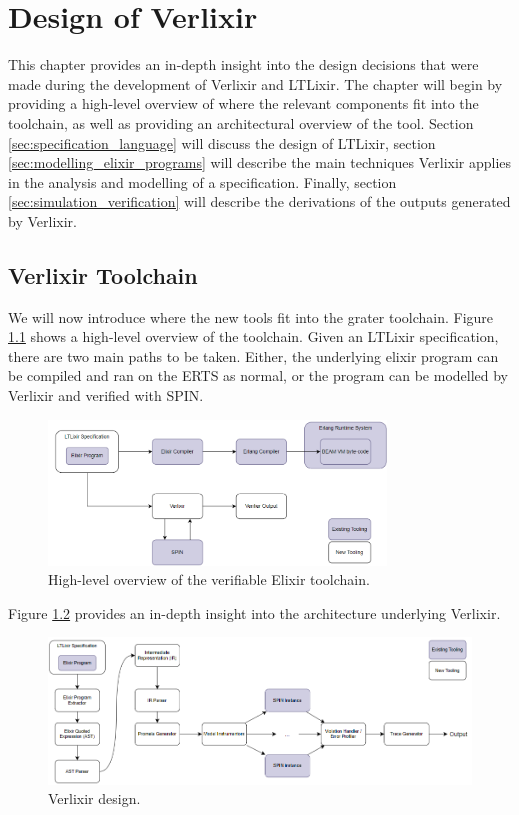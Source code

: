 \chapter{Design of Verlixir} \label{chap:design}
This chapter provides an in-depth insight into the design decisions that were made during the development of Verlixir and LTLixir. The chapter will begin by providing a high-level overview of where the relevant components fit into the toolchain, as well as providing an architectural overview of the tool. Section \ref{sec:specification_language} will discuss the design of LTLixir, section \ref{sec:modelling_elixir_programs} will describe the main techniques Verlixir applies in the analysis and modelling of a specification. Finally, section \ref{sec:simulation_verification} will describe the derivations of the outputs generated by Verlixir.  
\section{Verlixir Toolchain} \label{sec:toolchain}
We will now introduce where the new tools fit into the grater toolchain. Figure \ref{fig:high_level} shows a high-level overview of the toolchain. Given an LTLixir specification, there are two main paths to be taken. Either, the underlying elixir program can be compiled and ran on the ERTS as normal, or the program can be modelled by Verlixir and verified with SPIN.
\begin{figure}[H]
    \centering
    \includegraphics[width=0.8\textwidth]{images/high_level_system.png}
    \caption{High-level overview of the verifiable Elixir toolchain.}
    \label{fig:high_level}
\end{figure}
Figure \ref{fig:low_level} provides an in-depth insight into the architecture underlying Verlixir.
\begin{figure}[H]
    \centering
    \includegraphics[width=1\textwidth]{images/low_level_system.png}
    \caption{Verlixir design.}
    \label{fig:low_level}
\end{figure}
